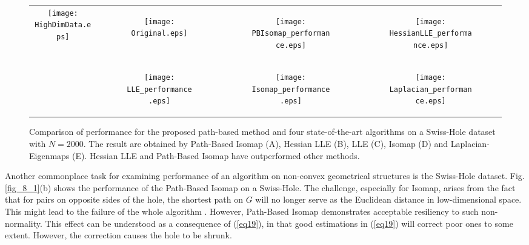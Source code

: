 \documentclass[10pt,journal,cspaper,compsoc]{IEEEtran}
\let\MYoriglatexcaption\caption
\renewcommand{\caption}[2][\relax]{\MYoriglatexcaption[#2]{#2}}
\begin{document}
\begin{figure*}[t]    
\centering
\begin{tabular}{cc|ccc}
	\multicolumn{2}{c|}{\multirow{2}{*}{	
\begin{minipage}[r]{0.3\textwidth}
			\vspace{-4mm}
			\texttt{[image: HighDimData.eps]}
		\end{minipage}    	    	    	
}} & 
	\begin{subfigure}[c]{0.2\textwidth}
        \texttt{[image: Original.eps]}
    \end{subfigure} & 
	\begin{subfigure}[c]{0.2\textwidth}
    	\texttt{[image: PBIsomap\_performance.eps]}                
    \end{subfigure} &
	\begin{subfigure}[c]{0.2\textwidth}
        \texttt{[image: HessianLLE\_performance.eps]}
    \end{subfigure}    
    \\ \multicolumn{2}{c|}{} & 
	\begin{subfigure}[c]{0.2\textwidth}
        \texttt{[image: LLE\_performance.eps]}
    \end{subfigure} &
    \begin{subfigure}[c]{0.2\textwidth}
    	\texttt{[image: Isomap\_performance.eps]}
    \end{subfigure} &
    \begin{subfigure}[c]{0.2\textwidth}
    	\texttt{[image: Laplacian\_performance.eps]}
    \end{subfigure}
\end{tabular}
	\vspace{3mm}
    \caption{{\small Comparison of performance for the proposed path-based method and four state-of-the-art algorithms on a Swiss-Hole dataset with $N=2000$. The result are obtained by Path-Based Isomap (A), Hessian LLE (B), LLE (C), Isomap (D) and Laplacian-Eigenmaps (E). Hessian LLE and Path-Based Isomap have outperformed other methods.}}
    \label{fig_perf_comp}
\end{figure*}

Another commonplace task for examining performance of an algorithm on non-convex geometrical structures is the Swiss-Hole dataset.
Fig.\ref{fig_8_1}(b) shows the performance of the Path-Based Isomap on a Swiss-Hole. The challenge, especially for Isomap, arises from the fact that for pairs on opposite sides of the hole, the shortest path on $G$ will no longer serve as the Euclidean distance in low-dimensional space. This might lead to the failure of the whole algorithm \cite{wang2008manifold}. However, Path-Based Isomap demonstrates acceptable resiliency to such non-normality. This effect can be understood as a consequence of (\ref{eq19}), in that good estimations in (\ref{eq19}) will correct poor ones to some extent. However, the correction causes the hole to be shrunk.
\end{document}
